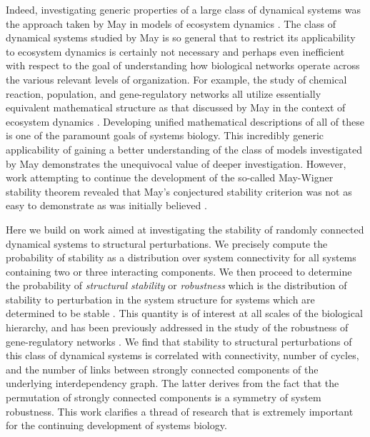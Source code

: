 Indeed, investigating generic properties of a large class of dynamical systems was the approach taken by May in models of ecosystem dynamics \cite{Gardner1970,May1972}. The class of dynamical systems studied by May is so general that to restrict its applicability to ecosystem dynamics is certainly not necessary and perhaps even inefficient with respect to the goal of understanding how biological networks operate across the various relevant levels of organization. For example, the study of chemical reaction, population, and gene-regulatory networks all utilize essentially equivalent mathematical structure as that discussed by May in the context of ecosystem dynamics \cite{RossCr2003,Alon2006,Palsson2006,HamidBolouri2008,Palsson2011a,Voit2012,Sauro2012}. Developing unified mathematical descriptions of all of these is one of the paramount goals of systems biology. This incredibly generic applicability of gaining a better understanding of the class of models investigated by May demonstrates the unequivocal value of deeper investigation.  However, work attempting to continue the development of the so-called May-Wigner stability theorem revealed that May's conjectured stability criterion was not as easy to demonstrate as was initially believed \cite{Cohen1984,May1972a,Radius2014}.

Here we build on work aimed at investigating the stability of randomly connected dynamical systems to structural perturbations. We precisely compute the probability of stability as a distribution over system connectivity for all systems containing two or three interacting components. We then proceed to determine the probability of \emph{structural stability} or \emph{robustness} which is the distribution of stability to perturbation in the system structure for systems which are determined to be stable \cite{Smale1967}. This quantity is of interest at all scales of the biological hierarchy, and has been previously addressed in the study of the robustness of gene-regulatory networks \cite{WADDINGTON1942a,VanNimwegen1999,Siegal2002,Ciliberti2007b,Ciliberti2007,Wagner2013}. We find that stability to structural perturbations of this class of dynamical systems is correlated with connectivity, number of cycles, and the number of links between strongly connected components of the underlying interdependency graph. The latter derives from the fact that the permutation of strongly connected components is a symmetry of system robustness. This work clarifies a thread of research that is extremely important for the continuing development of systems biology.

